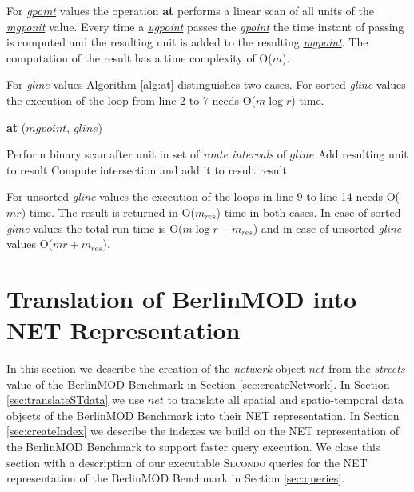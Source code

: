 \documentclass[a4paper]{article}
\newcommand{\secondo}{\textsc{Secondo}}
\newcommand{\bmodb} {BerlinMOD Benchmark}
\newcommand{\op}[1]{\textbf{#1}}
\newcommand{\dt}[1]{\textsl{\underline{#1}}}
\begin{document}
For \dt{gpoint} values
the operation \op{at} performs a linear scan of all units of the \dt{mgponit}
value. Every time a \dt{ugpoint} passes the \dt{gpoint} the time instant of
passing is computed and the resulting unit is added to the resulting
\dt{mgpoint}.
The computation of the result has a time complexity of O($m$).

For \dt{gline} values Algorithm \ref{alg:at} distinguishes two cases. For sorted
\dt{gline} values the execution of the loop from line 2 to 7 needs O($m \log r$)
time.
\begin{algorithm}[H]
  \caption{\op{at} ($mgpoint$, $gline$)}
  \label{alg:at}
  \begin{algorithmic}[1]
        \STATE Perform binary scan after unit in set of \textit{route intervals} of $gline$
          \STATE Add resulting unit to result
        \ENDIF
      \ENDFOR
    \ELSE
            \STATE Compute intersection and add it to result
          \ENDIF
        \ENDFOR
      \ENDFOR
    \ENDIF
    \RETURN result
  \end{algorithmic}
\end{algorithm}
For unsorted \dt{gline} values the execution of the loops in line 9 to line 14
needs O($mr$) time. The result is returned in O($m_{res}$) time in both cases.
In case
of sorted \dt{gline} values the total run time is O($m \log {r} + m_{res}$)
and in case of unsorted \dt{gline} values O($mr + m_{res}$).
\section{Translation of BerlinMOD into NET Representation}
\label{sec:Translation}
In this section we describe the creation of the \dt{network} object $net$ from
the \textit{streets} value of the \bmodb{} in Section \ref{sec:createNetwork}. In
Section \ref{sec:translateSTdata} we use $net$ to translate all spatial and
spatio-temporal data objects of the \bmodb{} into their NET representation.
In Section \ref{sec:createIndex} we describe the indexes we build on the
NET representation of the \bmodb{} to support faster query execution.
We close this section with a description of our
executable \secondo{} queries for the NET representation of the \bmodb{} in
Section \ref{sec:queries}.
\end{document}
